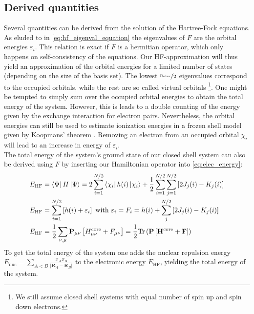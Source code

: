 \subsection{Derived quantities}
\label{subsec:background_hf_derived_quantities}
Several quantities can be derived from the solution of the Hartree-Fock equations. As eluded to in \autoref{eq:hf_eigenval_equation} the eigenvalues of $F$ are the orbital energies $\varepsilon_i$. This relation is exact if $F$ is a hermitian operator, which only happens on self-consistency of the equations. Our HF-approximation will thus yield an approximation of the orbital energies for a limited number of states (depending on the size of the basis set). The lowest $\nicefrac{n_\text{elec}}{2}$ eigenvalues correspond to the occupied orbitals, while the rest are so called virtual orbitals \footnote{We still assume closed shell systems with equal number of spin up and spin down electrons.}. One might be tempted to simply sum over the occupied orbital energies to obtain the total energy of the system. However, this is leads to a double counting of the energy given by the exchange interaction for electron pairs. Nevertheless, the orbital energies can still be used to estimate ionization energies in a frozen shell model given by Koopmans' theorem \parencite{ref:koopmans1934}. Removing an electron from an occupied orbital $\chi_i$ will lead to an increase in energy of $\varepsilon_i$.\\

The total energy of the system's ground state of our closed shell system can also be derived using $F$ by inserting our Hamiltonian operator into \autoref{eq:elec_energy}:
\begin{subequations}
\begin{align}
    E_\text{HF} &= \bra{\Psi} H \ket{\Psi} = 2\sum_{i=1}^{N/2} \bra{\chi_i} h(i) \ket{\chi_i}
    + \frac{1}{2}\sum_{i=1}^{N/2}\sum_{j=1}^{N/2} \left[ 2 J_j(i) - K_j(i) \right]\\
    E_\text{HF} &= \sum_{i=1}^{N/2}\left[ h(i) + \varepsilon_i\right] \text{  with  } \varepsilon_i = F_i =  h(i) + \sum_{j}^{N/2} \left[ 2 J_j(i) - K_j(i) \right]\\
    E_\text{HF} &= \frac{1}{2} \sum_{\nu, \mu} \mathbf{P}_{\mu \nu} \left[ H_{\mu \nu}^\text{core} + F_{\mu \nu} \right] = \frac{1}{2} \text{Tr} \left( \mathbf{P} \left[ \mathbf{H}^\text{core} + \mathbf{F} \right] \right)
\end{align}
\end{subequations}
To get the total energy of the system one adds the nuclear repulsion energy $E_\text{nuc} = \sum_{A<B} \frac{Z_A Z_B}{|\mathbf{R}_A - \mathbf{R}_B|}$ to the electronic energy $E_\text{HF}$, yielding the total energy of the system.\\

